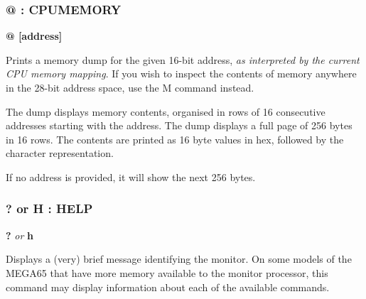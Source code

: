 \subsubsection{@ : CPUMEMORY}
\begin{description}[leftmargin=2cm,style=nextline]
\item [Format:] {\bf @ [address]}
\item [Usage:] Prints a memory dump for the given 16-bit address,
  {\em as interpreted by the current CPU memory mapping}.
  If you wish to inspect the contents of memory anywhere in the 28-bit
  address space, use the M command instead.

  The dump displays memory contents, organised in rows
  of 16 consecutive addresses starting with the
  address. The dump displays
  a full page of 256 bytes in 16 rows.
  The contents are printed as 16 byte values in hex,
  followed by the character representation.

\item [Remarks:] If no address is provided, it will show the next 256 bytes.

\end{description}

\subsubsection{? or H : HELP}
\begin{description}[leftmargin=2cm,style=nextline]
\item [Format:] {\bf ?} {\em or} {\bf h}
\item [Usage:] Displays a (very) brief message identifying the monitor.
  On some models of the MEGA65 that have more memory available to the
  monitor processor, this command may display information about each
  of the available commands.

\end{description}


